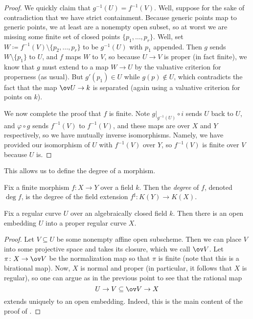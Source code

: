 \documentclass[../notes.tex]{subfiles}
\begin{document}
\begin{proof}
	We quickly claim that $g^{-1}(U)=f^{-1}(V)$. Well, suppose for the sake of contradiction that we have strict containment. Because generic points map to generic points, we at least are a nonempty open subset, so at worst we are missing some finite set of closed points $\{p_1,\ldots,p_r\}$. Well, set $W\coloneqq f^{-1}(V)\setminus\{p_2,\ldots,p_r\}$ to be $g^{-1}(U)$ with $p_1$ appended. Then $g$ sends $W\setminus\{p_1\}$ to $U$, and $f$ maps $W$ to $V$, so because $U\to V$ is proper (in fact finite), we know that $g$ must extend to a map $W\to U$ by the valuative criterion for properness (as usual). But $g'(p_1)\in U$ while $g(p)\notin U$, which contradicts the fact that the map $\ov U\to k$ is separated (again using a valuative criterion for points on $k$).

	We now complete the proof that $f$ is finite. Note $g|_{g^{-1}(U)
	}\circ i$ sends $U$ back to $U$, and $\varphi\circ g$ sends $f^{-1}(V)$ to $f^{-1}(V)$, and these maps are over $X$ and $Y$ respectively, so we have mutually inverse isomorphisms. Namely, we have provided our isomorphism of $U$ with $f^{-1}(V)$ over $Y$, so $f^{-1}(V)$ is finite over $V$ because $U$ is.
\end{proof}
This allows us to define the degree of a morphism.
\begin{definition}[degree]
	Fix a finite morphism $f\colon X\to Y$ over a field $k$. Then the \textit{degree} of $f$, denoted $\deg f$, is the degree of the field extension $f^\sharp\colon K(Y)\to K(X)$.
\end{definition}
\begin{proposition}
	Fix a regular curve $U$ over an algebraically closed field $k$. Then there is an open embedding $U$ into a proper regular curve $X$.
\end{proposition}
\begin{proof}
	Let $V\subseteq U$ be some nonempty affine open subscheme. Then we can place $V$ into some projective space and takes its closure, which we call $\ov V$. Let $\pi\colon X\to\ov V$ be the normalization map so that $\pi$ is finite (note that this is a birational map). Now, $X$ is normal and proper (in particular, it follows that $X$ is regular), so one can argue as in the previous point to see that the rational map
	\[U\to V\subseteq\ov V\to X\]
	extends uniquely to an open embedding. Indeed, this is the main content of the proof of .
\end{proof}
\end{document}

